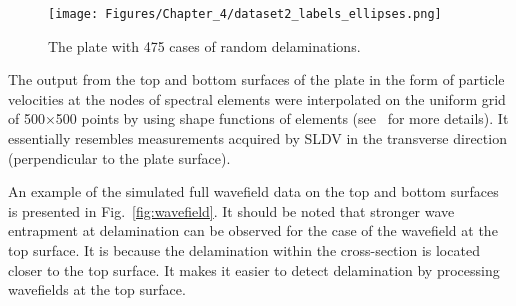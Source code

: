 \begin{figure}[!htb]
	\centering
	\texttt{[image: Figures/Chapter\_4/dataset2\_labels\_ellipses.png]}
	\caption{The plate with 475 cases of random delaminations.}
	\label{fig:random_delam}
\end{figure}

The output from the top and bottom surfaces of the plate in the form of particle velocities at the nodes of spectral elements were interpolated on the uniform grid of 500\(\times\)500 points by using shape functions of elements (see~\cite{Kudela2020} for more details).
It essentially resembles measurements acquired by SLDV in the transverse direction (perpendicular to the plate surface).

An example of the simulated full wavefield data on the top and bottom surfaces is presented in Fig.~\ref{fig:wavefield}.
It should be noted that stronger wave entrapment at delamination can be observed for the case of the wavefield at the top surface.
It is because the delamination within the cross-section is located closer to the top surface.
It makes it easier to detect delamination by processing wavefields at the top surface.

